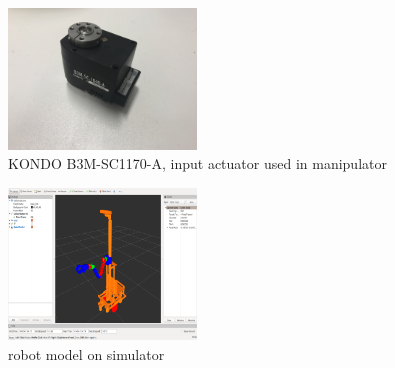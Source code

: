 \begin{figure}[!h]
\begin{center}
\includegraphics[width=5cm]{servo.jpg}
\caption{KONDO B3M-SC1170-A, input actuator used in manipulator}
\label{fig:servo}
\end{center}
\end{figure}

\begin{figure}[!h]
\begin{center}
\includegraphics[width=5cm]{model.png}
\caption{robot model on simulator}
\label{fig:model}
\end{center}
\end{figure}